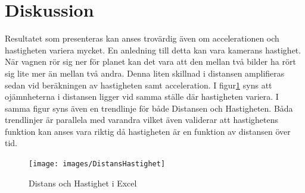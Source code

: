 \documentclass[11p, titlepage, oneside, a4paper]{article}
\begin{document}
    \section{Diskussion}
        Resultatet som presenteras kan anses trovärdig även om accelerationen och hastigheten variera mycket. En
        anledning till detta kan vara kamerans hastighet.
        När vagnen rör sig ner för planet kan det vara att den mellan två bilder ha rört sig lite mer än mellan två
        andra.
        Denna liten skillnad i distansen amplifieras sedan vid beräkningen av hastigheten samt acceleration.
        I figur\ref{fig:distanshastighet} syns att ojämnheterna i distansen ligger vid samma ställe där hastigheten variera.
        I samma figur syns även en trendlinje för både Distansen och Hastigheten.
        Båda trendlinjer är parallela med varandra vilket även validerar att hastighetens funktion kan anses vara riktig då hastigheten är en funktion av distansen över tid.


        \begin{figure}[!h]
            \centering
            \texttt{[image: images/DistansHastighet]}
            \caption{Distans och Hastighet i Excel}
            \label{fig:distanshastighet}
        \end{figure}
\end{document}
